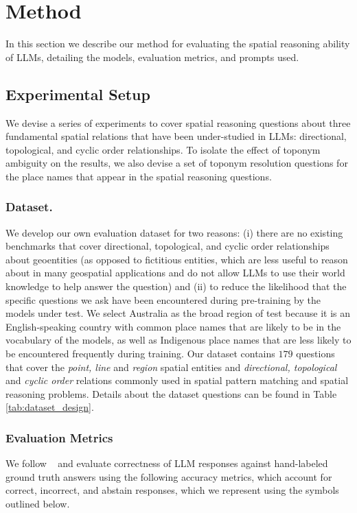 \section{Method}
\label{section:method}

In this section we describe our method for evaluating the spatial reasoning ability of LLMs, detailing the models, evaluation metrics, and prompts used.


\subsection{Experimental Setup}
We devise a series of experiments to cover spatial reasoning questions about three fundamental spatial relations that have been under-studied in LLMs: directional, topological, and cyclic order relationships.
To isolate the effect of toponym ambiguity on the results, we also devise a set of toponym resolution questions for the place names that appear in the spatial reasoning questions.



\subsubsection{Dataset.} 
We develop our own evaluation dataset for two reasons: (i) there are no existing benchmarks that cover directional, topological, and cyclic order relationships about geoentities (as opposed to fictitious entities, which are less useful to reason about in many geospatial applications and do not allow LLMs to use their world knowledge to help answer the question) and (ii) to reduce the likelihood that the specific questions we ask have been encountered during pre-training by the models under test. 
We select Australia as the broad region of test because it is an English-speaking country with common place names that are likely to be in the vocabulary of the models, as well as Indigenous place names that are less likely to be encountered frequently during training. 
Our dataset contains $179$ questions that cover the \textit{point, line} and \textit{region} spatial entities and \textit{directional, topological} and \textit{cyclic order} relations commonly used in spatial pattern matching and spatial reasoning problems.
Details about the dataset questions can be found in Table \ref{tab:dataset_design}.




\subsubsection{Evaluation Metrics}
We follow \citeauthor{Feng2024}~\cite{Feng2024} and evaluate correctness of LLM responses against hand-labeled ground truth answers using the following accuracy metrics, which account for correct, incorrect, and abstain responses, which we represent using the symbols outlined below.

